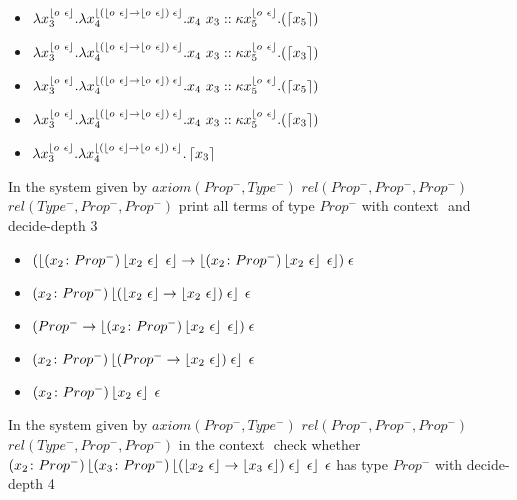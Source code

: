 \documentclass{scrartcl}
\begin{document}
\begin{itemize}
\item $ 
 \lambda x_3^{\left \lfloor o~\epsilon \right \rfloor}.\lambda x_4^{\left \lfloor (\left \lfloor o~\epsilon \right \rfloor \to \left \lfloor o~\epsilon \right \rfloor) \; \epsilon \right \rfloor}.x_4~x_3 :: \kappa x_5^{\left \lfloor o~\epsilon \right \rfloor}.(\left \lceil x_5 \right \rceil) 
 $
\item $ 
 \lambda x_3^{\left \lfloor o~\epsilon \right \rfloor}.\lambda x_4^{\left \lfloor (\left \lfloor o~\epsilon \right \rfloor \to \left \lfloor o~\epsilon \right \rfloor) \; \epsilon \right \rfloor}.x_4~x_3 :: \kappa x_5^{\left \lfloor o~\epsilon \right \rfloor}.(\left \lceil x_3 \right \rceil) 
 $
\item $ 
 \lambda x_3^{\left \lfloor o~\epsilon \right \rfloor}.\lambda x_4^{\left \lfloor (\left \lfloor o~\epsilon \right \rfloor \to \left \lfloor o~\epsilon \right \rfloor) \; \epsilon \right \rfloor}.x_4~x_3 :: \kappa x_5^{\left \lfloor o~\epsilon \right \rfloor}.(\left \lceil x_5 \right \rceil) 
 $
\item $ 
 \lambda x_3^{\left \lfloor o~\epsilon \right \rfloor}.\lambda x_4^{\left \lfloor (\left \lfloor o~\epsilon \right \rfloor \to \left \lfloor o~\epsilon \right \rfloor) \; \epsilon \right \rfloor}.x_4~x_3 :: \kappa x_5^{\left \lfloor o~\epsilon \right \rfloor}.(\left \lceil x_3 \right \rceil) 
 $
\item $ 
 \lambda x_3^{\left \lfloor o~\epsilon \right \rfloor}.\lambda x_4^{\left \lfloor (\left \lfloor o~\epsilon \right \rfloor \to \left \lfloor o~\epsilon \right \rfloor) \; \epsilon \right \rfloor}.\left \lceil x_3 \right \rceil 
 $
\end{itemize}
In the system given by $axiom (Prop^-,Type^-)$ $rel (Prop^-,Prop^-,Prop^-)$ $rel (Type^-,Prop^-,Prop^-)$ print all terms of type $Prop^-$ with context ${}$ and decide-depth 3
\begin{itemize}
\item $ 
 (\left \lfloor (x_2\colon Prop^-)\left \lfloor x_2~\epsilon \right \rfloor \; \epsilon \right \rfloor \to \left \lfloor (x_2\colon Prop^-)\left \lfloor x_2~\epsilon \right \rfloor \; \epsilon \right \rfloor) \; \epsilon 
 $
\item $ 
 (x_2\colon Prop^-)\left \lfloor (\left \lfloor x_2~\epsilon \right \rfloor \to \left \lfloor x_2~\epsilon \right \rfloor) \; \epsilon \right \rfloor \; \epsilon 
 $
\item $ 
 (Prop^- \to \left \lfloor (x_2\colon Prop^-)\left \lfloor x_2~\epsilon \right \rfloor \; \epsilon \right \rfloor) \; \epsilon 
 $
\item $ 
 (x_2\colon Prop^-)\left \lfloor (Prop^- \to \left \lfloor x_2~\epsilon \right \rfloor) \; \epsilon \right \rfloor \; \epsilon 
 $
\item $ (x_2\colon Prop^-)\left \lfloor x_2~\epsilon \right \rfloor \; \epsilon $
\end{itemize}
In the system given by $axiom (Prop^-,Type^-)$ $rel (Prop^-,Prop^-,Prop^-)$ $rel (Type^-,Prop^-,Prop^-)$  in the context ${}$ check whether $(x_2\colon Prop^-)\left \lfloor (x_3\colon Prop^-)\left \lfloor (\left \lfloor x_2~\epsilon \right \rfloor \to \left \lfloor x_3~\epsilon \right \rfloor) \; \epsilon \right \rfloor \; \epsilon \right \rfloor \; \epsilon$ has type $Prop^-$ with decide-depth 4
\end{document}
